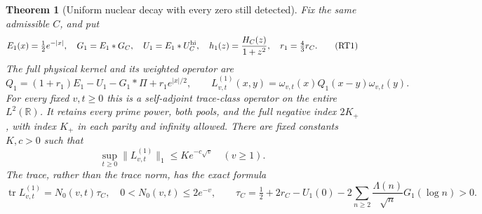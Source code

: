 \documentclass[11pt]{article}
\newtheorem{theorem}{Theorem}
\theoremstyle{remark}\newtheorem{remark}[theorem]{Remark}
\begin{document}
\begin{theorem}[Uniform nuclear decay with every zero still detected]
\label{thm:smoothed-rest-trace}
Fix the same admissible \(C\), and put
\[
 E_1(x)=\tfrac12e^{-|x|},\quad G_1=E_1*G_C,\quad
 U_1=E_1*U_C^{\rm hi},\quad
 h_1(z)=\frac{H_C(z)}{1+z^2},\quad r_1=\tfrac43r_C .
 \tag{RT1}
\]
The full physical kernel and its weighted operator are
\[
 Q_1=(1+r_1)E_1-U_1-G_1*\Pi+r_1e^{|x|/2},\qquad
 L^{(1)}_{v,t}(x,y)=\omega_{v,t}(x)Q_1(x-y)\omega_{v,t}(y).
 \tag{RT2}
\]
For every fixed \(v,t\ge0\) this is a self-adjoint trace-class
operator on the entire \(L^2(\mathbb R)\). It retains every prime
power, both pools, and the full negative index \(2K_+\), with
index \(K_+\) in each parity and infinity allowed.
There are fixed constants \(K,c>0\) such that
\[
 \sup_{t\ge0}\|L^{(1)}_{v,t}\|_1\le Ke^{-c\sqrt v}\quad(v\ge1).
 \tag{RT3}
\]
The trace, rather than the trace norm, has the exact formula
\[
 \operatorname{tr}L^{(1)}_{v,t}
 =N_0(v,t)\tau_C,\quad 0<N_0(v,t)\le2e^{-v},\qquad
 \tau_C=\tfrac12+2r_C-U_1(0)
       -2\sum_{n\ge2}\frac{\Lambda(n)}{\sqrt n}G_1(\log n)>0 .
 \tag{RT4}
\]
\end{theorem}
\end{document}
